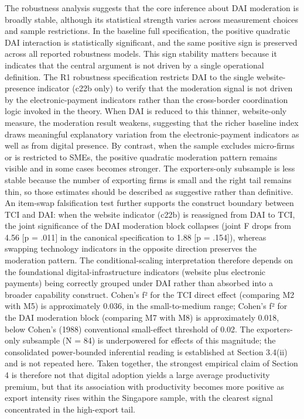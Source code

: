 \documentclass[
  12pt,a4paper]{article}
\begin{document}
The robustness analysis suggests that the core inference about DAI
moderation is broadly stable, although its statistical strength varies
across measurement choices and sample restrictions. In the baseline full
specification, the positive quadratic DAI interaction is statistically
significant, and the same positive sign is preserved across all reported
robustness models. This sign stability matters because it indicates that
the central argument is not driven by a single operational definition.
The R1 robustness specification restricts DAI to the single
website-presence indicator (c22b only) to verify that the moderation
signal is not driven by the electronic-payment indicators rather than
the cross-border coordination logic invoked in the theory. When DAI is
reduced to this thinner, website-only measure, the moderation result
weakens, suggesting that the richer baseline index draws meaningful
explanatory variation from the electronic-payment indicators as well as
from digital presence. By contrast, when the sample excludes micro-firms
or is restricted to SMEs, the positive quadratic moderation pattern
remains visible and in some cases becomes stronger. The exporters-only
subsample is less stable because the number of exporting firms is small
and the right tail remains thin, so those estimates should be described
as suggestive rather than definitive. An item-swap falsification test
further supports the construct boundary between TCI and DAI: when the
website indicator (c22b) is reassigned from DAI to TCI, the joint
significance of the DAI moderation block collapses (joint F drops from
4.56 {[}p = .011{]} in the canonical specification to 1.88 {[}p =
.154{]}), whereas swapping technology indicators in the opposite
direction preserves the moderation pattern. The conditional-scaling
interpretation therefore depends on the foundational
digital-infrastructure indicators (website plus electronic payments)
being correctly grouped under DAI rather than absorbed into a broader
capability construct. Cohen's f² for the TCI direct effect (comparing M2
with M5) is approximately 0.036, in the small-to-medium range; Cohen's
f² for the DAI moderation block (comparing M7 with M8) is approximately
0.018, below Cohen's (1988) conventional small-effect threshold of 0.02.
The exporters-only subsample (N = 84) is underpowered for effects of
this magnitude; the consolidated power-bounded inferential reading is
established at Section 3.4(ii) and is not repeated here. Taken together,
the strongest empirical claim of Section 4 is therefore not that digital
adoption yields a large average productivity premium, but that its
association with productivity becomes more positive as export intensity
rises within the Singapore sample, with the clearest signal concentrated
in the high-export tail.
\end{document}
